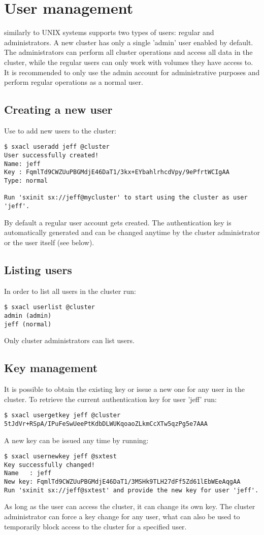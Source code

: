 \section{User management}
\SX similarly to UNIX systems supports two types of users: regular and
administrators. A new cluster has only a single 'admin' user enabled by
default. The administrators can perform all cluster operations and access
all data in the cluster, while the regular users can only work with volumes
they have access to. It is recommended to only use the admin account for
administrative purposes and perform regular operations as a normal user.

\subsection{Creating a new user}
Use  to add new users to the cluster:
\begin{lstlisting}
$ sxacl useradd jeff @cluster
User successfully created!
Name: jeff
Key : FqmlTd9CWZUuPBGMdjE46DaT1/3kx+EYbahlrhcdVpy/9ePfrtWCIgAA
Type: normal

Run 'sxinit sx://jeff@mycluster' to start using the cluster as user 'jeff'.
\end{lstlisting}
By default a regular user account gets created. The authentication key is
automatically generated and can be changed anytime by the cluster
administrator or the user itself (see below).

\subsection{Listing users}
In order to list all users in the cluster run:
\begin{lstlisting}
$ sxacl userlist @cluster
admin (admin)
jeff (normal)
\end{lstlisting}
Only cluster administrators can list users.

\subsection{Key management}
It is possible to obtain the existing key or issue a new one for any
user in the cluster. To retrieve the current authentication key for
user 'jeff' run:
\begin{lstlisting}
$ sxacl usergetkey jeff @cluster
5tJdVr+RSpA/IPuFeSwUeePtKdbDLWUKqoaoZLkmCcXTw5qzPg5e7AAA
\end{lstlisting}
A new key can be issued any time by running:
\begin{lstlisting}
$ sxacl usernewkey jeff @sxtest
Key successfully changed!
Name   : jeff
New key: FqmlTd9CWZUuPBGMdjE46DaT1/3MSHk9TLH27dFf5Zd61lEbWEeAqgAA
Run 'sxinit sx://jeff@sxtest' and provide the new key for user 'jeff'.
\end{lstlisting}
As long as the user can access the cluster, it can change its own
key. The cluster administrator can force a key change for any user,
what can also be used to temporarily block access to the cluster for
a specified user.

